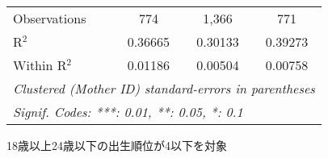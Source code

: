 \documentclass{article}
\begin{document}
\begin{landscape}
\begin{threeparttable}[b]
\begin{tabular}{lccc}
      Observations                                        & 774                 & 1,366        & 771\\  
      R$^2$                                               & 0.36665             & 0.30133      & 0.39273\\  
      Within R$^2$                                        & 0.01186             & 0.00504      & 0.00758\\  
      \midrule \midrule
      \multicolumn{4}{l}{\emph{Clustered (Mother ID) standard-errors in parentheses}}\\
      \multicolumn{4}{l}{\emph{Signif. Codes: ***: 0.01, **: 0.05, *: 0.1}}\\
   \end{tabular}
   
   \begin{tablenotes}\item 18歳以上24歳以下の出生順位が4以下を対象
   \end{tablenotes}
\end{threeparttable}
\par\endgroup


\end{landscape}
\end{document}
